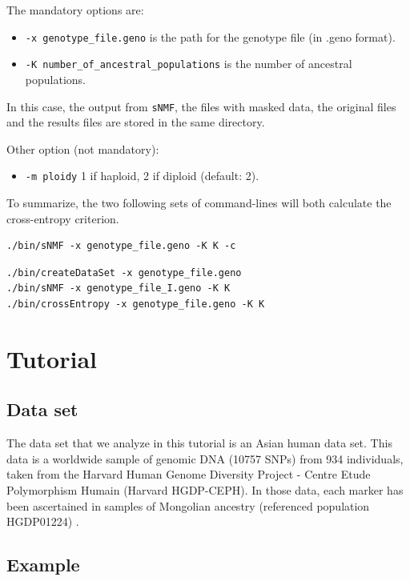 \documentclass[10pt,a4paper]{article}
\begin{document}
\begin{itemize}
The mandatory options are:
\begin{itemize}
\item \verb|-x genotype_file.geno| is the path for the genotype file (in .geno format).
\item \verb|-K number_of_ancestral_populations| is the number of ancestral populations.
\end{itemize}

In this case, the output from {\tt sNMF}, the files with masked data, the original files and the results files 
are stored in the same directory.

\noindent
Other option (not mandatory):
\begin{itemize}
\item \verb|-m ploidy|  1 if haploid, 2 if diploid (default: 2). 
\end{itemize}

\end{itemize}

To summarize, the two following sets of command-lines will both calculate the cross-entropy criterion. 
\begin{Verbatim}[frame=single]
./bin/sNMF -x genotype_file.geno -K K -c
\end{Verbatim}

\begin{Verbatim}[frame=single]
./bin/createDataSet -x genotype_file.geno 
./bin/sNMF -x genotype_file_I.geno -K K
./bin/crossEntropy -x genotype_file.geno -K K
\end{Verbatim}

\section{Tutorial}

\subsection{Data set}
The data set that we analyze in this tutorial is an Asian human data set.
This data is a worldwide sample of genomic DNA (10757 SNPs) from 934 individuals,
taken from the Harvard Human Genome Diversity Project - Centre
Etude Polymorphism Humain (Harvard HGDP-CEPH). 
In those data, each marker has been ascertained in samples of Mongolian
ancestry (referenced population HGDP01224) \cite{Patterson_2012}. 

\subsection{Example}
\end{document}

